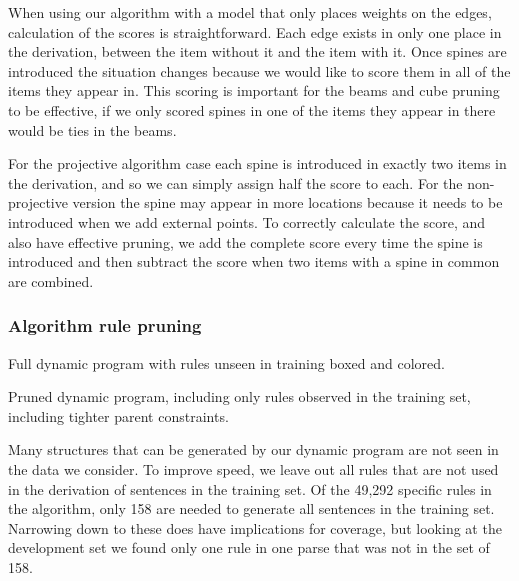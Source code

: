 When using our algorithm with a model that only places weights on the edges, calculation of the scores is straightforward.
Each edge exists in only one place in the derivation, between the item without it and the item with it.
Once spines are introduced the situation changes because we would like to score them in all of the items they appear in.
This scoring is important for the beams and cube pruning to be effective, if we only scored spines in one of the items they appear in there would be ties in the beams.

For the projective algorithm case each spine is introduced in exactly two items in the derivation, and so we can simply assign half the score to each.
For the non-projective version the spine may appear in more locations because it needs to be introduced when we add external points.
To correctly calculate the score, and also have effective pruning, we add the complete score every time the spine is introduced and then subtract the score when two items with a spine in common are combined.

\subsubsection{Algorithm rule pruning}

\begin{algorithm}
\vspace{-2mm}

\vspace{-10mm}
\caption{\label{fig:rules-to-prune}
Full dynamic program with rules unseen in training boxed and colored.
}
\end{algorithm}

\begin{algorithm}
\vspace{-2mm}

\vspace{-8mm}
\caption{\label{fig:rules-pruned}
Pruned dynamic program, including only rules observed in the training set, including tighter parent constraints.
}
\end{algorithm}

Many structures that can be generated by our dynamic program are not seen in the data we consider.
To improve speed, we leave out all rules that are not used in the derivation of sentences in the training set.
Of the 49,292 specific rules in the algorithm, only 158 are needed to generate all sentences in the training set.
Narrowing down to these does have implications for coverage, but looking at the development set we found only one rule in one parse that was not in the set of 158.

